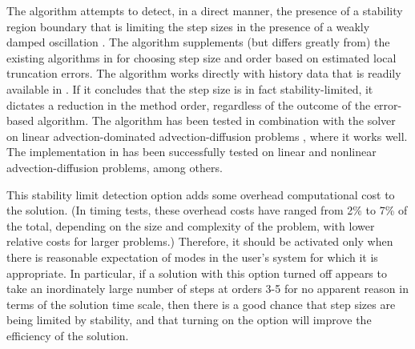 The {\stald} algorithm attempts to detect, in a direct
manner, the presence of a stability region boundary that is limiting
the step sizes in the presence of a weakly damped oscillation \cite{Hi92}.
The algorithm supplements (but differs greatly from) the existing
algorithms in {\cvodes} for choosing step size and order based on
estimated local truncation errors.  The {\stald} algorithm works directly
with history data that is readily available in {\cvodes}.  If it concludes
that the step size is in fact stability-limited, it dictates a
reduction in the method order, regardless of the outcome of the
error-based algorithm.  The {\stald} algorithm has been tested in
combination with the {\vode} solver on linear advection-dominated
advection-diffusion problems \cite{Hi95}, where it works well.  The
implementation in {\cvodes} has been successfully tested on linear 
and nonlinear advection-diffusion problems, among others.

This stability limit detection option adds some overhead computational
cost to the {\cvodes} solution.  (In timing tests, these overhead costs
have ranged from 2\% to 7\% of the total, depending on the size and
complexity of the problem, with lower relative costs for larger
problems.)  Therefore, it should be activated only when there is
reasonable expectation of modes in the user's system for which it is
appropriate.  In particular, if a {\cvodes} solution with this option
turned off appears to take an inordinately large number of steps at
orders 3-5 for no apparent reason in terms of the solution time scale,
then there is a good chance that step sizes are being limited by
stability, and that turning on the option will improve the efficiency
of the solution. 

